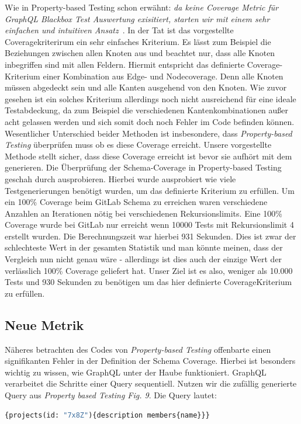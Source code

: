 Wie in Property-based Testing schon erwähnt: \textit{da keine Coverage Metric für GraphQL Blackbox Test Auswertung exisitiert, starten wir mit einem sehr
einfachen und intuitiven Ansatz}~\cite[vgl. B. Measuring Schema Coverage]{property-based-testing}.
In der Tat ist das vorgestellte Coveragekriterirum ein sehr einfaches Kriterium.
Es lässt zum Beispiel die Beziehungen zwischen allen Knoten aus und beachtet nur, dass alle Knoten inbegriffen sind mit allen Feldern.
Hiermit entspricht das definierte Coverage-Kriterium einer Kombination aus Edge- und Nodecoverage.
Denn alle Knoten müssen abgedeckt sein und alle Kanten ausgehend von den Knoten.
Wie zuvor gesehen ist ein solches Kriterium allerdings noch nicht ausreichend für eine ideale Testabdeckung, da
zum Beispiel die verschiedenen Kantenkombinationen außer acht gelassen werden und sich somit doch noch Fehler im Code befinden können.
Wesentlicher Unterschied beider Methoden ist insbesondere, dass \textit{Property-based Testing} überprüfen muss ob es diese Coverage erreicht.
Unsere vorgestellte Methode stellt sicher, dass diese Coverage erreicht ist bevor sie aufhört mit dem generieren.
Die Überprüfung der Schema-Coverage in Property-based Testing geschah durch ausprobieren.
Hierbei wurde ausprobiert wie viele Testgenerierungen benötigt wurden, um das definierte Kriterium zu erfüllen.
Um ein 100\% Coverage beim GitLab Schema zu erreichen waren verschiedene Anzahlen an Iterationen nötig bei verschiedenen Rekursionslimits.
Eine 100\% Coverage wurde bei GitLab nur erreicht wenn 10000 Tests mit Rekursionslimit 4 erstellt wurden.
Die Berechnungszeit war hierbei 931 Sekunden.
Dies ist zwar der schlechteste Wert in der gesamten Statistik und man könnte meinen, dass der Vergleich
nun nicht genau wäre - allerdings ist dies auch der einzige Wert der verlässlich 100\% Coverage geliefert hat.
Unser Ziel ist es also, weniger als 10.000 Tests und 930 Sekunden zu benötigen um das hier definierte CoverageKriterium zu erfüllen.

\subsection{Neue Metrik}

Näheres betrachten des Codes von \textit{Property-based Testing} offenbarte einen signifikanten Fehler in der Definition der Schema Coverage.
Hierbei ist besonders wichtig zu wissen, wie GraphQL unter der Haube funktioniert.
GraphQL verarbeitet die Schritte einer Query sequentiell.
Nutzen wir die zufällig generierte Query aus \textit{Property based Testing Fig. 9}\cite{property-based-testing}.
Die Query lautet:
\begin{lstlisting}[language=GraphQL]
    {projects(id: "7x8Z"){description members{name}}}
\end{lstlisting}


